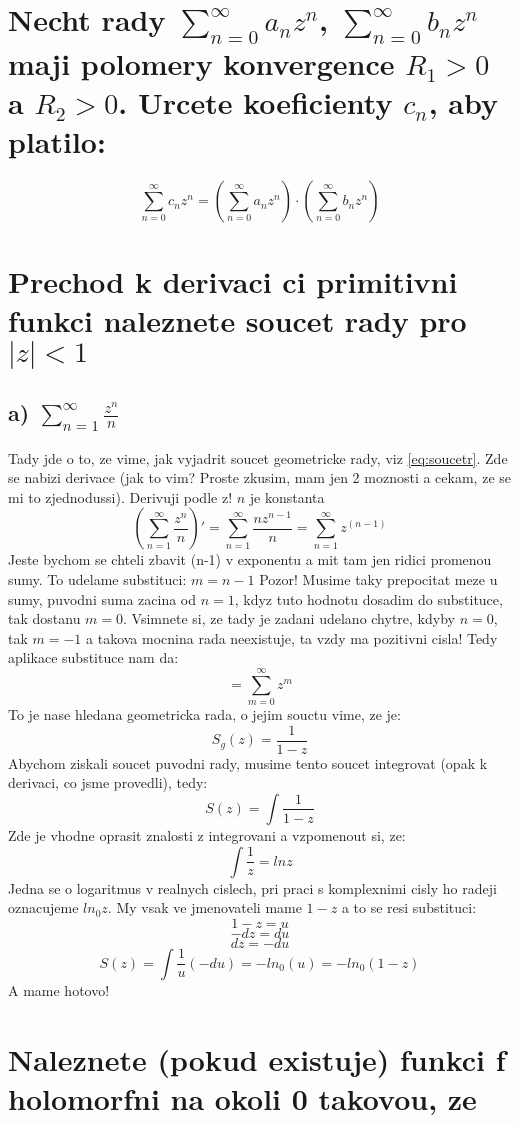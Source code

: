 
\section{Necht rady $\sum_{n=0}^\infty a_n z^n$, $\sum_{n=0}^\infty b_n z^n$ maji polomery konvergence $R_1 >0$ a $R_2 > 0$. Urcete koeficienty $c_n$, aby platilo:}
$$\sum_{n=0}^\infty c_n z^n = \left( \sum_{n=0}^\infty a_n z^n \right) \cdot \left( \sum_{n=0}^\infty b_n z^n \right) $$


\section{Prechod k derivaci ci primitivni funkci naleznete soucet rady pro $|z|<1$}
\subsection*{a) $\sum_{n=1}^\infty \frac{z^n}{n}$}
Tady jde o to, ze vime, jak vyjadrit soucet geometricke rady, viz \ref{eq:soucetr}. Zde se nabizi derivace (jak to vim? Proste zkusim, mam jen 2 moznosti a cekam, ze se mi to zjednodussi). Derivuji podle z! $n$ je konstanta
$$\left( \sum_{n=1}^\infty \frac{z^n}{n} \right)' = \sum_{n=1}^\infty \frac{n z^{n-1}}{n} = \sum_{n=1}^\infty z^{(n-1)}$$
Jeste bychom se chteli zbavit (n-1) v exponentu a mit tam jen ridici promenou sumy. To udelame substituci:
$m=n-1$
Pozor! Musime taky prepocitat meze u sumy, puvodni suma zacina od $n=1$, kdyz tuto hodnotu dosadim do substituce, tak dostanu $m=0$. Vsimnete si, ze tady je zadani udelano chytre, kdyby $n=0$, tak $m=-1$ a takova mocnina rada neexistuje, ta vzdy ma pozitivni cisla! Tedy aplikace substituce nam da:
$$=\sum_{m=0}^\infty z^m$$
To je nase hledana geometricka rada, o jejim souctu vime, ze je:
$$S_g(z) = \frac{1}{1-z}$$
Abychom ziskali soucet puvodni rady, musime tento soucet integrovat (opak k derivaci, co jsme provedli), tedy:
$$S(z) = \int \frac{1}{1-z}$$
Zde je vhodne oprasit znalosti z integrovani a vzpomenout si, ze:
$$\int \frac{1}{z} = ln z$$
Jedna se o logaritmus v realnych cislech, pri praci s komplexnimi cisly ho radeji oznacujeme $ln_0 z$. My vsak ve jmenovateli mame $1-z$ a to se resi substituci:
$$1-z = u$$
$$-dz = du$$
$$dz = -du$$
$$S(z)=\int \frac{1}{u}(-du) = - ln_0 (u) = - ln_0 (1-z)$$
A mame hotovo!


\section{Naleznete (pokud existuje) funkci f holomorfni na okoli 0 takovou, ze}
